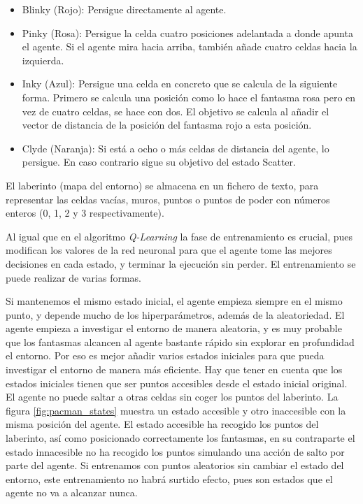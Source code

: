 		\vspace{-0.9cm}
		\begin{itemize}
			\item Blinky (Rojo): Persigue directamente al agente.
			\vspace*{-0.3cm}
			\item Pinky (Rosa): Persigue la celda cuatro posiciones adelantada a donde apunta el agente. Si el agente mira hacia arriba, también añade cuatro celdas hacia la izquierda.
			\vspace*{-0.3cm}
			\item Inky (Azul): Persigue una celda en concreto que se calcula de la siguiente forma. Primero se calcula una posición como lo hace el fantasma rosa pero en vez de cuatro celdas, se hace con dos. El objetivo se calcula al añadir el vector de distancia de la posición del fantasma rojo a esta posición.
			\vspace*{-0.3cm}
			\item Clyde (Naranja): Si está a ocho o más celdas de distancia del agente, lo persigue. En caso contrario sigue su objetivo del estado Scatter.
		\end{itemize}
		
		
		El laberinto (mapa del entorno) se almacena en un fichero de texto, para representar las celdas vacías, muros, puntos o puntos de poder con números enteros (0, 1, 2 y 3 respectivamente).
		
		
		Al igual que en el algoritmo \textit{Q-Learning} la fase de entrenamiento es crucial, pues modifican los valores de la red neuronal para que el agente tome las mejores decisiones en cada estado, y terminar la ejecución sin perder. El entrenamiento se puede realizar de varias formas.	
			
							
		Si mantenemos el mismo estado inicial, el agente empieza siempre en el mismo punto, y depende mucho de los hiperparámetros, además de la aleatoriedad. El agente empieza a investigar el entorno de manera aleatoria, y es muy probable que los fantasmas alcancen al agente bastante rápido sin explorar en profundidad el entorno. Por eso es mejor añadir varios estados iniciales para que pueda investigar el entorno de manera más eficiente. Hay que tener en cuenta que los estados iniciales tienen que ser puntos accesibles desde el estado inicial original. El agente no puede saltar a otras celdas sin coger los puntos del laberinto. La figura \ref{fig:pacman_states} muestra un estado accesible y otro inaccesible con la misma posición del agente. El estado accesible ha recogido los puntos del laberinto, así como posicionado correctamente los fantasmas, en su contraparte el estado innacesible no ha recogido los puntos simulando una acción de salto por parte del agente. Si entrenamos con puntos aleatorios sin cambiar el estado del entorno, este entrenamiento no habrá surtido efecto, pues son estados que el agente no va a alcanzar nunca.
			
